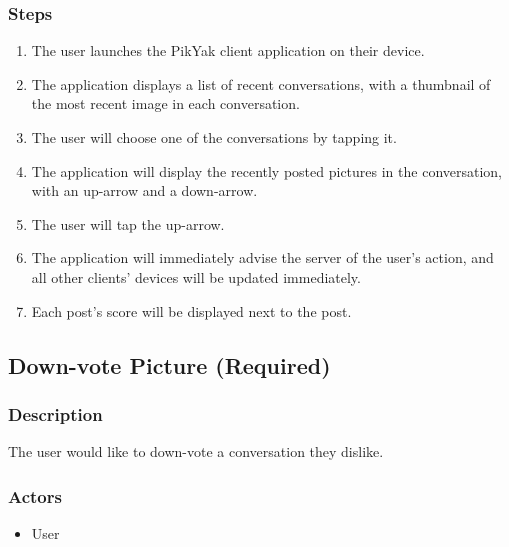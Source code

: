 \documentclass[11pt]{scrartcl}
\begin{document}
        \subsubsection{Steps}
            \begin{enumerate}
                \item The user launches the PikYak client application on their device.
                \item The application displays a list of recent conversations, with a thumbnail of the most recent image in each conversation.
                \item The user will choose one of the conversations by tapping it.
                \item The application will display the recently posted pictures in the conversation, with an up-arrow and a down-arrow.
                \item The user will tap the up-arrow.
                \item The application will immediately advise the server of the user's action, and all other clients' devices will be updated immediately.
                \item Each post's score will be displayed next to the post.
            \end{enumerate}

    \subsection{Down-vote Picture (Required)}
    \label{sec:downvote}
        \subsubsection{Description}
            The user would like to down-vote a conversation they dislike.
        \subsubsection{Actors}
            \begin{itemize}
                \item User
            \end{itemize}
\end{document}

